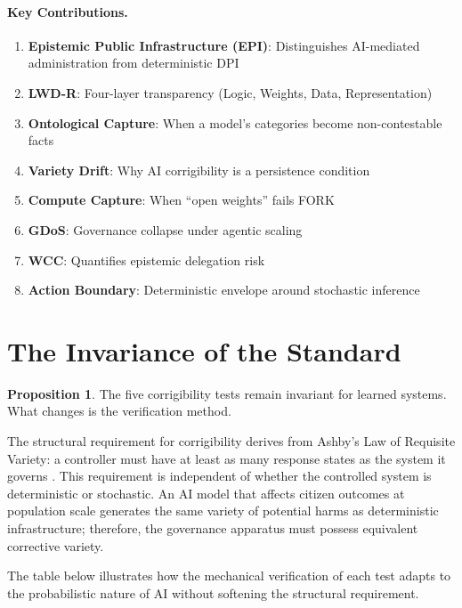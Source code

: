 \documentclass[11pt,a4paper]{article}
\theoremstyle{definition}
\newtheorem{proposition}{Proposition}[section]
\begin{document}
\paragraph{Key Contributions.}
\begin{enumerate}[noitemsep]
    \item \textbf{Epistemic Public Infrastructure (EPI)}: Distinguishes AI-mediated administration from deterministic DPI
    \item \textbf{LWD-R}: Four-layer transparency (Logic, Weights, Data, Representation)
    \item \textbf{Ontological Capture}: When a model's categories become non-contestable facts
    \item \textbf{Variety Drift}: Why AI corrigibility is a persistence condition
    \item \textbf{Compute Capture}: When ``open weights'' fails FORK
    \item \textbf{GDoS}: Governance collapse under agentic scaling
    \item \textbf{WCC}: Quantifies epistemic delegation risk
    \item \textbf{Action Boundary}: Deterministic envelope around stochastic inference
\end{enumerate}


\section{The Invariance of the Standard}
\label{sec:invariance}

\begin{proposition}
The five corrigibility tests remain invariant for learned systems. What changes is the verification method.
\end{proposition}

The structural requirement for corrigibility derives from Ashby's Law of Requisite Variety: a controller must have at least as many response states as the system it governs \citep{ashby1956}. This requirement is independent of whether the controlled system is deterministic or stochastic. An AI model that affects citizen outcomes at population scale generates the same variety of potential harms as deterministic infrastructure; therefore, the governance apparatus must possess equivalent corrective variety.

The table below illustrates how the mechanical verification of each test adapts to the probabilistic nature of AI without softening the structural requirement.
\end{document}

